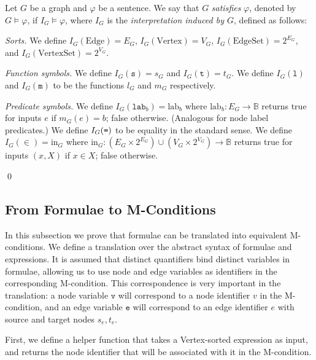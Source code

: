 \documentclass{llncs}
\newcommand{\mt}[1]{\text{\tt{#1}}}
\begin{document}
	\begin{definition}\label{defn:interpretation_function}\label{defn:satisfaction_graphs}\rm
		Let $G$ be a graph and $\varphi$ be a sentence. We say that $G$ \emph{satisfies} $\varphi$, denoted by $G \models \varphi$, if $I_G \models \varphi$, where $I_G$ is the \emph{interpretation induced by $G$}, defined as follows:


		\emph{Sorts.} We define $I_G(\text{Edge})=E_G$, $I_G(\text{Vertex})=V_G$, $I_G(\text{EdgeSet}) = 2^{E_G}$, and  $I_G(\text{VertexSet}) = 2^{V_G}$.
		
		\emph{Function symbols.} We define $I_G(\mathtt{s}) = s_G$ and $I_G(\mathtt{t}) = t_G$. We define $I_G(\mathtt{l})$ and $I_G(\mathtt{m})$ to be the functions $l_G$ and $m_G$ respectively.

		\emph{Predicate symbols.} We define $I_G(\mathtt{lab}_b) = \text{lab}_b$ where $\text{lab}_b\!: E_G \rightarrow \mathbb{B}$ returns true for inputs $e$ if $m_G(e) = b$; false otherwise. (Analogous for node label predicates.) We define $I_G(\mt{=})$ to be equality in the standard sense. We define $I_G(\in) = \text{in}_G$ where $\text{in}_G\!:(E_G\times 2^{E_G})\cup (V_G\times 2^{V_G})\rightarrow \mathbb{B}$ returns true for inputs $(x,X)$ if $x \in X$; false otherwise.

	\qed
	\end{definition}
	
	
	
	\subsection{From Formulae to M-Conditions}
	
	In this subsection we prove that formulae can be translated into equivalent M-conditions. We define a translation over the abstract syntax of formulae and expressions. It is assumed that distinct quantifiers bind distinct variables in formulae, allowing us to use node and edge variables as identifiers in the corresponding M-condition. This correspondence is very important in the translation: a node variable $\mathtt{v}$ will correspond to a node identifier $v$ in the M-condition, and an edge variable $\mathtt{e}$ will correspond to an edge identifier $e$ with source and target nodes $s_e, t_e$.
	
	First, we define a helper function that takes a Vertex-sorted expression as input, and returns the node identifier that will be associated with it in the M-condition.
	
\end{document}
